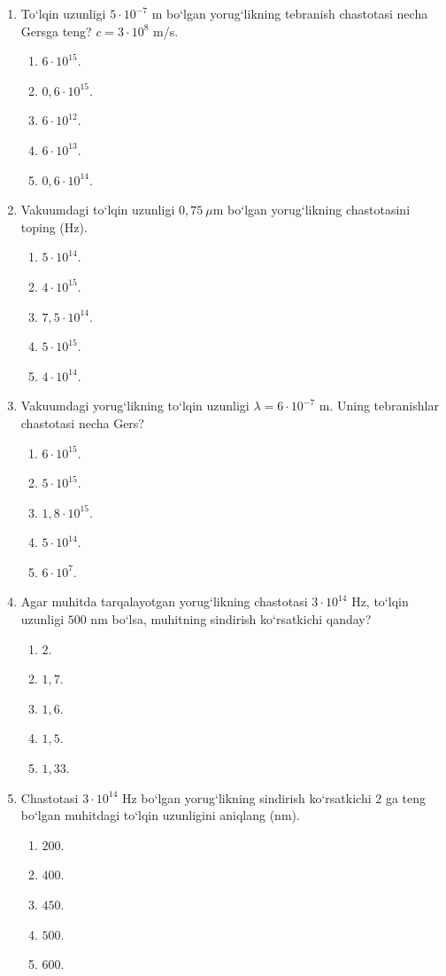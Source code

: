 \begin{enumerate}
\item To‘lqin uzunligi $5\cdot10^{-7}$ m bo‘lgan yorug‘likning tebranish chastotasi necha Gersga teng? $c=3\cdot10^8$ m/s.
\begin{enumerate}[label=\Alph*)]
\item $6\cdot10^{15}$.
\item $0,6\cdot10^{15}$.
\item $6\cdot10^{12}$.
\item $6\cdot10^{13}$.
\item $0,6\cdot10^{14}$.
\end{enumerate}

\item Vakuumdagi to‘lqin uzunligi $0,75~\mu$m bo‘lgan yorug‘likning chastotasini toping (Hz).
\begin{enumerate}[label=\Alph*)]
\item $5\cdot10^{14}$.
\item $4\cdot10^{15}$.
\item $7,5\cdot10^{14}$.
\item $5\cdot10^{15}$.
\item $4\cdot10^{14}$.
\end{enumerate}

\item Vakuumdagi yorug‘likning to‘lqin uzunligi $\lambda=6\cdot10^{-7}$ m. Uning tebranishlar chastotasi necha Gers?
\begin{enumerate}[label=\Alph*)]
\item $6\cdot10^{15}$.
\item $5\cdot10^{15}$.
\item $1,8\cdot10^{15}$.
\item $5\cdot10^{14}$.
\item $6\cdot10^7$.
\end{enumerate}

\item Agar muhitda tarqalayotgan yorug‘likning chastotasi $3\cdot10^{14}$ Hz, to‘lqin uzunligi $500$ nm bo‘lsa, muhitning sindirish ko‘rsatkichi qanday?
\begin{enumerate}[label=\Alph*)]
\item $2$.
\item $1,7$.
\item $1,6$.
\item $1,5$.
\item $1,33$.
\end{enumerate}

\item Chastotasi $3\cdot10^{14}$ Hz bo‘lgan yorug‘likning sindirish ko‘rsatkichi $2$ ga teng bo‘lgan muhitdagi to‘lqin uzunligini aniqlang (nm).
\begin{enumerate}[label=\Alph*)]
\item $200$.
\item $400$.
\item $450$.
\item $500$.
\item $600$.
\end{enumerate}


\end{enumerate}
